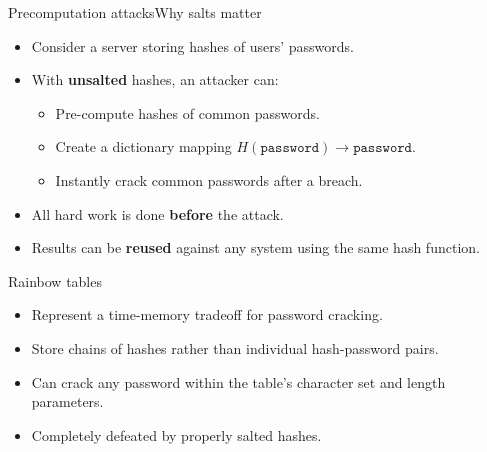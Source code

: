 \documentclass[aspectratio=169, lualatex, handout]{beamer}
\begin{document}
\begin{frame}{Precomputation attacks}{Why salts matter}
	\begin{itemize}[<+->]
		\item Consider a server storing hashes of users' passwords.
		\item With \textbf{unsalted} hashes, an attacker can:
		      \begin{itemize}
			      \item Pre-compute hashes of common passwords.
			      \item Create a dictionary mapping $H(\texttt{password}) \rightarrow \texttt{password}$.
			      \item Instantly crack common passwords after a breach.
		      \end{itemize}
		\item All hard work is done \textbf{before} the attack.
		\item Results can be \textbf{reused} against any system using the same hash function.
	\end{itemize}
\end{frame}

\begin{frame}{Rainbow tables}
	\begin{itemize}[<+->]
		\item Represent a time-memory tradeoff for password cracking.
		\item Store chains of hashes rather than individual hash-password pairs.
		\item Can crack any password within the table's character set and length parameters.
		\item Completely defeated by properly salted hashes.
	\end{itemize}
\end{frame}
\end{document}
